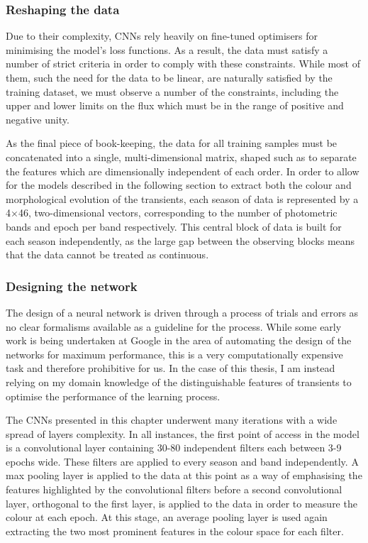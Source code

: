 \subsubsection{Reshaping the data}
Due to their complexity, CNNs rely heavily on fine-tuned optimisers for minimising the model's loss functions. As a result, the data must satisfy a number of strict criteria in order to comply with these constraints. While most of them, such the need for the data to be linear, are naturally satisfied by the training dataset, we must observe a number of the constraints, including the upper and lower limits on the flux which must be in the range of positive and negative unity.

As the final piece of book-keeping, the data for all training samples must be concatenated into a single, multi-dimensional matrix, shaped such as to separate the features which are dimensionally independent of each order. In order to allow for the models described in the following section to extract both the colour and morphological evolution of the transients, each season of data is represented by a 4$\times$46, two-dimensional vectors, corresponding to the number of photometric bands and epoch per band respectively. This central block of data is built for each season independently, as the large gap between the observing blocks means that the data cannot be treated as continuous.

\subsubsection{Designing the network} \label{sec:AGNNoiseModel}
The design of a neural network is driven through a process of trials and errors as no clear formalisms available as a guideline for the process. While some early work is being  undertaken at Google in the area of automating the design of the networks for maximum performance, this is a very computationally expensive task and therefore prohibitive for us. In the case of this thesis, I am instead relying on my domain knowledge of the distinguishable features of transients to optimise the performance of the learning process.

The CNNs presented in this chapter underwent many iterations with a wide spread of layers complexity. In all instances, the first point of access in the model is a convolutional layer containing 30-80 independent filters each between 3-9 epochs wide. These filters are applied to every season and band independently. A max pooling layer is applied to the data at this point as a way of emphasising the features highlighted by the convolutional filters before a second convolutional layer, orthogonal to the first layer, is applied to the data in order to measure the colour at each epoch. At this stage, an average pooling layer is used again extracting the two most prominent features in the colour space for each filter.

